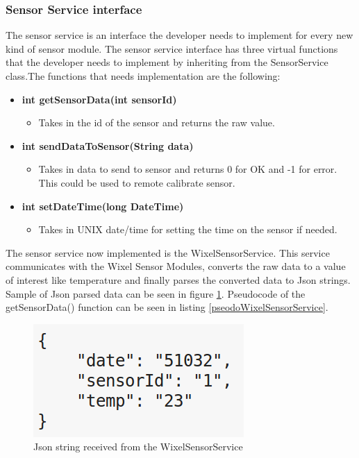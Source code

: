 \subsubsection{Sensor Service interface}
The sensor service is an interface the developer needs to implement for every new kind of
sensor module. The sensor service interface has three virtual functions that the developer
needs to implement by inheriting from the SensorService class.The functions that needs implementation are the following:
\begin{itemize}
    \item \textbf{int getSensorData(int sensorId)}
        \begin{itemize}
            \item Takes in the id of the sensor and returns the raw value.
        \end{itemize}
    \item \textbf{int sendDataToSensor(String data)}
        \begin{itemize}
            \item Takes in data to send to sensor and returns 0 for OK and -1 for error.
                  This could be used to remote calibrate sensor.
        \end{itemize}
    \item \textbf{int setDateTime(long DateTime)}
        \begin{itemize}
            \item Takes in UNIX date/time for setting the time on the sensor if needed.
        \end{itemize}
\end{itemize}
The sensor service now implemented is the WixelSensorService. This service communicates 
with the Wixel Sensor Modules, converts the raw data to a value of interest like 
temperature and finally parses the converted data to Json\cite{json} strings. Sample
of Json parsed data can be seen in figure \ref{fig:JsonTemp}. Pseudocode of the 
getSensorData() function can be seen in listing \ref{pseodoWixelSensorService}.
\begin{figure}[H]
\centering
\includegraphics[width=0.4\linewidth]{graphics/JsonTemp}
\caption{Json\cite{json} string received from the WixelSensorService\label{fig:JsonTemp}}
\end{figure}
